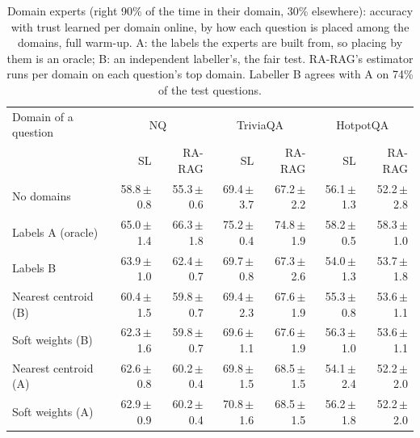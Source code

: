 \begin{table}
\centering
\small
\begin{tabular}{@{}lrrrrrr@{}}
\toprule
Domain of a question & \multicolumn{2}{c}{NQ} & \multicolumn{2}{c}{TriviaQA} & \multicolumn{2}{c}{HotpotQA} \\
 & SL & RA-RAG & SL & RA-RAG & SL & RA-RAG \\
\midrule
No domains & 58.8\,{\scriptsize$\pm$0.8} & 55.3\,{\scriptsize$\pm$0.6} & 69.4\,{\scriptsize$\pm$3.7} & 67.2\,{\scriptsize$\pm$2.2} & 56.1\,{\scriptsize$\pm$1.3} & 52.2\,{\scriptsize$\pm$2.8} \\
Labels A (oracle) & 65.0\,{\scriptsize$\pm$1.4} & 66.3\,{\scriptsize$\pm$1.8} & 75.2\,{\scriptsize$\pm$0.4} & 74.8\,{\scriptsize$\pm$1.9} & 58.2\,{\scriptsize$\pm$0.5} & 58.3\,{\scriptsize$\pm$1.0} \\
Labels B & 63.9\,{\scriptsize$\pm$1.0} & 62.4\,{\scriptsize$\pm$0.7} & 69.7\,{\scriptsize$\pm$0.8} & 67.3\,{\scriptsize$\pm$2.6} & 54.0\,{\scriptsize$\pm$1.3} & 53.7\,{\scriptsize$\pm$1.8} \\
Nearest centroid (B) & 60.4\,{\scriptsize$\pm$1.5} & 59.8\,{\scriptsize$\pm$0.7} & 69.4\,{\scriptsize$\pm$2.3} & 67.6\,{\scriptsize$\pm$1.9} & 55.3\,{\scriptsize$\pm$0.8} & 53.6\,{\scriptsize$\pm$1.1} \\
Soft weights (B) & 62.3\,{\scriptsize$\pm$1.6} & 59.8\,{\scriptsize$\pm$0.7} & 69.6\,{\scriptsize$\pm$1.1} & 67.6\,{\scriptsize$\pm$1.9} & 56.3\,{\scriptsize$\pm$1.0} & 53.6\,{\scriptsize$\pm$1.1} \\
Nearest centroid (A) & 62.6\,{\scriptsize$\pm$0.8} & 60.2\,{\scriptsize$\pm$0.4} & 69.8\,{\scriptsize$\pm$1.5} & 68.5\,{\scriptsize$\pm$1.5} & 54.1\,{\scriptsize$\pm$2.4} & 52.2\,{\scriptsize$\pm$2.0} \\
Soft weights (A) & 62.9\,{\scriptsize$\pm$0.9} & 60.2\,{\scriptsize$\pm$0.4} & 70.8\,{\scriptsize$\pm$1.6} & 68.5\,{\scriptsize$\pm$1.5} & 56.2\,{\scriptsize$\pm$1.8} & 52.2\,{\scriptsize$\pm$2.0} \\
\bottomrule
\end{tabular}
\caption{Domain experts (right 90\% of the time in their domain, 30\% elsewhere): accuracy with trust learned per domain online, by how each question is placed among the domains, full warm-up. A: the labels the experts are built from, so placing by them is an oracle; B: an independent labeller's, the fair test. RA-RAG's estimator runs per domain on each question's top domain. Labeller B agrees with A on 74\% of the test questions.}
\label{tab:domains}
\end{table}
